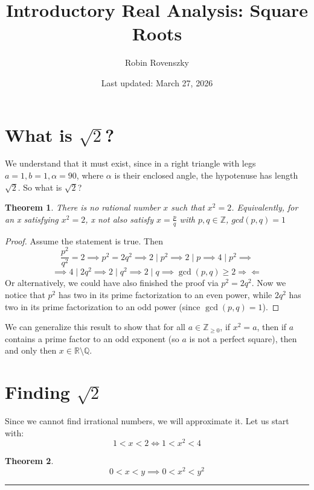 \documentclass{article}
\title{Introductory Real Analysis: Square Roots}
\author{Robin Rovenszky}
\date{Last updated: March 27, 2026}
\newtheorem{theorem}{Theorem}
\begin{document}
\maketitle
\tableofcontents
\newpage

\section{What is $\sqrt{2}$?}
We understand that it must exist, since in a right triangle with legs $a = 1, b= 1, \alpha = 90$, where $\alpha$ is their enclosed angle, the hypotenuse has length $\sqrt{2}$. So what is $\sqrt{2}$?

\begin{theorem}
    There is no rational number $x$ such that $x^2 = 2$. Equivalently, for an x satisfying $x^2 = 2$, x not also satisfy $x = \frac{p}{q}$ with $p, q \in \mathbb{Z}$, $gcd(p, q) = 1$
\end{theorem}
\begin{proof}
    Assume the statement is true. Then
    \begin{equation}
        \frac{p^2}{q^2} = 2 \implies p^2 = 2q^2 \implies 2 \mid p^2 \implies 2 \mid p \implies 4 \mid p^2 \implies
    \end{equation}
    \begin{equation}
        \implies 4 \mid 2q^2 \implies 2 \mid q^2 \implies 2 \mid q \implies \gcd(p, q) \ge 2 \Rightarrow\!\Leftarrow
    \end{equation}
    Or alternatively, we could have also finished the proof via
    $p^2 = 2q^2$. Now we notice that $p^2$ has two in its prime factorization to an even power, while $2q^2$ has two in its prime factorization to an odd power (since $\gcd(p,q) = 1$).
\end{proof}

We can generalize this result to show that for all $a \in \mathbb{Z}_{\ge 0}$, if $x^2 = a$, then if $a$ contains a prime factor to an odd exponent (so $a$ is not a perfect square), then and only then $x \in \mathbb{R} \setminus \mathbb{Q}$.

\section{Finding $\sqrt{2}$}
Since we cannot find irrational numbers, we will approximate it. Let us start with:
\[
1 < x < 2 \Leftrightarrow 1 < x^2 < 4
\]
\begin{theorem}
    \[
    0 < x < y \implies 0 < x^2 < y^2
    \]
\end{theorem}
\hrule
\vspace{1em}
\end{document}
